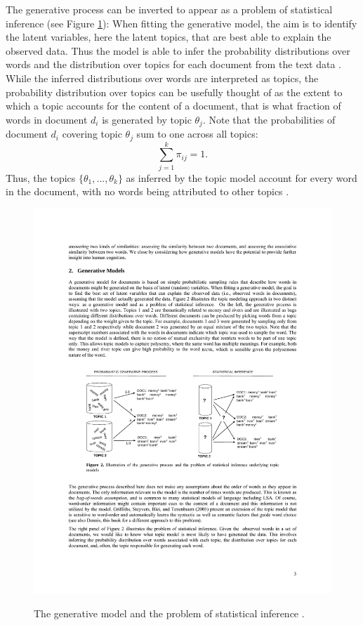 \documentclass[11pt,a4paper,english,oneside]{book}
\numberwithin{equation}{chapter}
\begin{document}
The generative process can be inverted to appear as a problem of statistical inference (see Figure \ref{genproc}): When fitting the generative model, the aim is to identify the latent variables, here the latent topics, that are best able to explain the observed data. Thus the model is able to infer the probability distributions over words and the distribution over topics for each document from the text data \cite[~p. 3]{Steyvers(2007)}. While the inferred distributions over words are interpreted as topics, the probability distribution over topics can be usefully thought of as the extent to which a topic accounts for the content of a document, that is what fraction of words in document $d_i$ is generated by topic $\theta_j$. Note that the probabilities of document $d_i$ covering topic $\theta_{j}$ sum to one across all topics:
$$
\sum_{j=1}^{k} \pi_{ij} = 1.
$$
Thus, the topics $\{\theta_1, ..., \theta_k\}$ as inferred by the topic model account for every word in the document, with no words being attributed to other topics \cite[pp.~338]{Zhai.2016}. 

\begin{figure}
	\caption{The generative model and the problem of statistical inference \cite[p.3]{Steyvers(2007)}.}
	\centering
	\includegraphics[scale=1]{Images/genproc.pdf}
	\label{genproc}
\end{figure}
\end{document}
